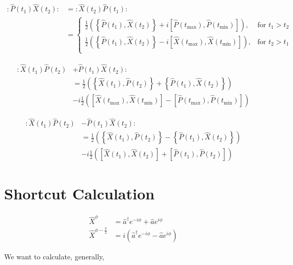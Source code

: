 \documentclass[12pt]{article}
\begin{document}
\begin{align}
:\hat{P}(t_1)\hat{X}(t_2): &= :\hat{X}(t_2)\hat{P}(t_1):\\
&= 
\begin{cases}
\frac{1}{2}\left(\left\{\hat{P}(t_1),\hat{X}(t_2)\right\} + i \left[\hat{P}(t_{\text{max}}),\hat{P}(t_{\text{min}})\right]\right), &\text{for } t_1>t_2\\
\frac{1}{2}\left(\left\{\hat{P}(t_1),\hat{X}(t_2)\right\} - i \left[\hat{X}(t_\text{max}),\hat{X}(t_{\text{min}})\right]\right), &\text{for } t_2>t_1\\
\end{cases}
\end{align}

\begin{align}
:\hat{X}(t_1)\hat{P}(t_2) &+ \hat{P}(t_1)\hat{X}(t_2):\\
&= \frac{1}{2} \left(\left\{\hat{X}(t_1),\hat{P}(t_2)\right\} + \left\{\hat{P}(t_1),\hat{X}(t_2)\right\}\right)\\
&-i\frac{1}{2}\left(\left[\hat{X}(t_\text{max}),\hat{X}(t_\text{min})\right] -\left[\hat{P}(t_\text{max}),\hat{P}(t_\text{min})\right]\right)
\end{align}

\begin{align}
:\hat{X}(t_1)\hat{P}(t_2) &- \hat{P}(t_1)\hat{X}(t_2):\\
&= \frac{1}{2} \left(\left\{\hat{X}(t_1),\hat{P}(t_2)\right\} - \left\{\hat{P}(t_1),\hat{X}(t_2)\right\}\right)\\
&-i\frac{1}{2}\left(\left[\hat{X}(t_1),\hat{X}(t_2)\right] +\left[\hat{P}(t_1),\hat{P}(t_2)\right]\right)
\end{align}

\clearpage

\section{Shortcut Calculation}

\begin{align}
\hat{X}^{\phi} &= \hat{a}^{\dag}e^{-i\phi} + \hat{a} e^{i\phi}\\
\hat{X}^{\phi-\frac{\pi}{2}} &= i\left(\hat{a}^{\dag}e^{-i\phi} - \hat{a} e^{i\phi}\right)
\end{align}

We want to calculate, generally,
\end{document}
